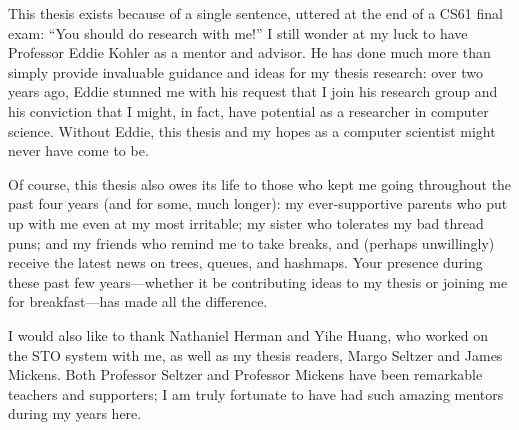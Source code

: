 This thesis exists because of a single sentence, uttered at the end of a CS61 final exam: ``You should do research with me!'' I still wonder at my luck to have Professor Eddie Kohler as a mentor and advisor. He has done much more than simply provide invaluable guidance and ideas for my thesis research: over two years ago, Eddie stunned me with his request that I join his research group and his conviction that I might, in fact, have potential as a researcher in computer science. Without Eddie, this thesis and my hopes as a computer scientist might never have come to be.

    Of course, this thesis also owes its life to those who kept me going throughout the past four years (and for some, much longer): my ever-supportive parents who put up with me even at my most irritable; my sister who tolerates my bad thread puns; and my friends who remind me to take breaks, and (perhaps unwillingly) receive the latest news on trees, queues, and hashmaps. Your presence during these past few years---whether it be contributing ideas to my thesis or joining me for breakfast---has made all the difference.

        I would also like to thank Nathaniel Herman and Yihe Huang, who worked on the STO system with me, as well as my thesis readers, Margo Seltzer and James Mickens. Both Professor Seltzer and Professor Mickens have been remarkable teachers and supporters; I am truly fortunate to have had such amazing mentors during my years here.
